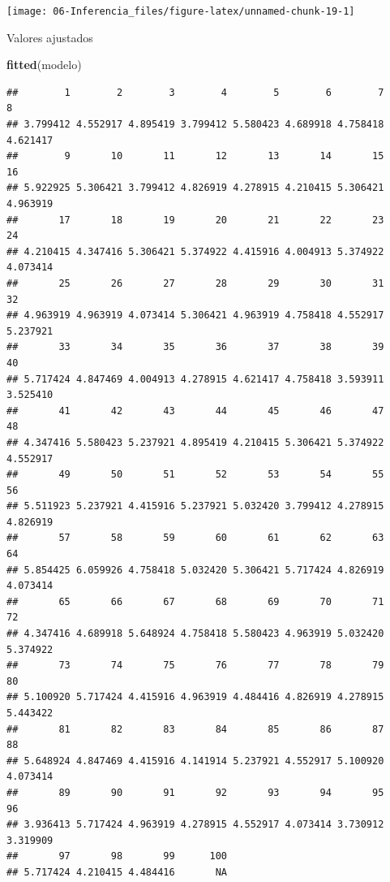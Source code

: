 \documentclass[]{book}
\newenvironment{Shaded}{\begin{snugshade}}{\end{snugshade}}
\newcommand{\KeywordTok}[1]{\textcolor[rgb]{0.13,0.29,0.53}{\textbf{#1}}}
\newcommand{\CommentTok}[1]{\textcolor[rgb]{0.56,0.35,0.01}{\textit{#1}}}
\newcommand{\OperatorTok}[1]{\textcolor[rgb]{0.81,0.36,0.00}{\textbf{#1}}}
\newcommand{\NormalTok}[1]{#1}
\begin{document}
\begin{Shaded}
\end{Shaded}

\begin{center}\texttt{[image: 06-Inferencia\_files/figure-latex/unnamed-chunk-19-1]} \end{center}

Valores ajustados

\begin{Shaded}
\begin{Highlighting}[]
\KeywordTok{fitted}\NormalTok{(modelo)}
\end{Highlighting}
\end{Shaded}

\begin{verbatim}
##        1        2        3        4        5        6        7        8 
## 3.799412 4.552917 4.895419 3.799412 5.580423 4.689918 4.758418 4.621417 
##        9       10       11       12       13       14       15       16 
## 5.922925 5.306421 3.799412 4.826919 4.278915 4.210415 5.306421 4.963919 
##       17       18       19       20       21       22       23       24 
## 4.210415 4.347416 5.306421 5.374922 4.415916 4.004913 5.374922 4.073414 
##       25       26       27       28       29       30       31       32 
## 4.963919 4.963919 4.073414 5.306421 4.963919 4.758418 4.552917 5.237921 
##       33       34       35       36       37       38       39       40 
## 5.717424 4.847469 4.004913 4.278915 4.621417 4.758418 3.593911 3.525410 
##       41       42       43       44       45       46       47       48 
## 4.347416 5.580423 5.237921 4.895419 4.210415 5.306421 5.374922 4.552917 
##       49       50       51       52       53       54       55       56 
## 5.511923 5.237921 4.415916 5.237921 5.032420 3.799412 4.278915 4.826919 
##       57       58       59       60       61       62       63       64 
## 5.854425 6.059926 4.758418 5.032420 5.306421 5.717424 4.826919 4.073414 
##       65       66       67       68       69       70       71       72 
## 4.347416 4.689918 5.648924 4.758418 5.580423 4.963919 5.032420 5.374922 
##       73       74       75       76       77       78       79       80 
## 5.100920 5.717424 4.415916 4.963919 4.484416 4.826919 4.278915 5.443422 
##       81       82       83       84       85       86       87       88 
## 5.648924 4.847469 4.415916 4.141914 5.237921 4.552917 5.100920 4.073414 
##       89       90       91       92       93       94       95       96 
## 3.936413 5.717424 4.963919 4.278915 4.552917 4.073414 3.730912 3.319909 
##       97       98       99      100 
## 5.717424 4.210415 4.484416       NA
\end{verbatim}
\end{document}

